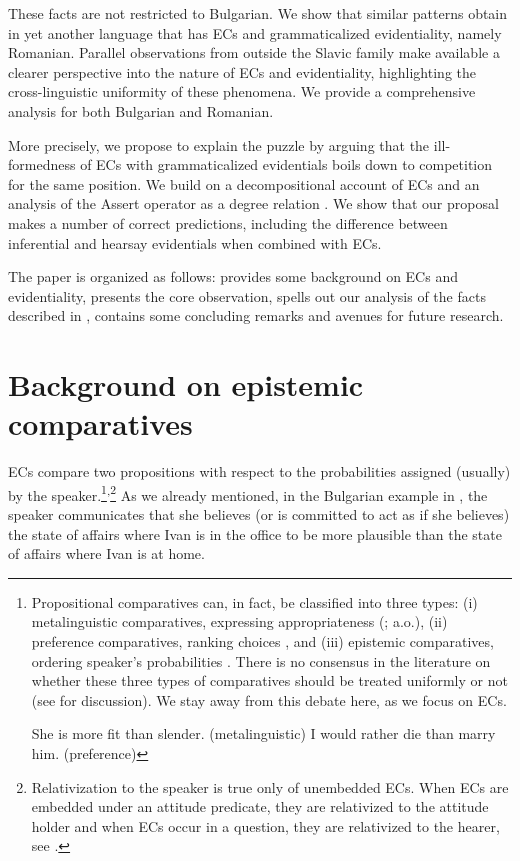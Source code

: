 \documentclass[output=paper,
]{langscibook}
\begin{document}
\noindent These facts are not restricted to Bulgarian. We show that similar patterns obtain in yet another language that has ECs and grammaticalized evidentiality, namely Romanian. Parallel observations from outside the Slavic family make available a clearer perspective into the nature of ECs and evidentiality, highlighting the cross-linguistic uniformity of these phenomena. We provide a comprehensive analysis for both Bulgarian and Romanian. 

More precisely, we propose to explain the puzzle by arguing that the ill-formed\-ness of ECs with grammaticalized evidentials boils down to competition for the same position. We build on a decompositional account of ECs \citep{herrub14} and an analysis of the Assert operator as a degree relation \citep{grewol17}. We show that our proposal makes a number of correct predictions, including  the difference between inferential and hearsay evidentials when combined with ECs. 

The paper is organized as follows:  provides some background on ECs and evidentiality,  presents the core observation,  spells out our analysis of the facts described in  ,  contains some concluding remarks and avenues for future research. 


\section{Background on epistemic comparatives}\label{background}
ECs compare two propositions with respect to the probabilities assigned (usually) by the speaker.\footnote{Propositional comparatives can, in fact, be classified into three types: (i) metalinguistic comparatives, expressing appropriateness (\citealt{bre73,mcc88,emb07,mor11}; a.o.), (ii) preference comparatives, ranking choices \citep{giasta09,giayoo11}, and (iii) epistemic comparatives, ordering speaker's probabilities \citep{finkra14,herrub14}. There is no consensus in the literature on whether these three types of comparatives should be treated uniformly or not (see \citealt{mor11} for discussion). We stay away from this debate here, as we focus on ECs. 

	\ea \ea She is more fit than slender. \hfill (metalinguistic)
	\ex I would rather die than marry him. \hfill (preference)
    \z \z
}\textsuperscript{,}\footnote{Relativization to the speaker is true only of unembedded ECs. When ECs are embedded under an attitude predicate, they are relativized to the attitude holder and when ECs occur in a question, they are relativized to the hearer, see \cite[562]{herrub14}.\label{fn:relativ}
} 
As we already mentioned, in the Bulgarian example in , the speaker communicates that she believes (or is committed to act as if she believes) the state of affairs where Ivan is in the office to be more plausible than the state of affairs where Ivan is at home. 
\end{document}
